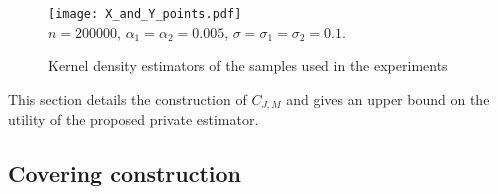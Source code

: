 \documentclass{article}
\theoremstyle{plain}
\theoremstyle{definition}
\theoremstyle{remark}
\begin{document}
\begin{figure*}[h!]
        \centering
        \texttt{[image: X\_and\_Y\_points.pdf]}  
    \\
    \centering
    $n = 200000$, $\alpha_1=\alpha_2 = 0.005$, $\sigma= \sigma_1=\sigma_2 = 0.1$.
    \caption{Kernel density estimators of the samples used in the experiments}
    \label{fig:samples}
    \end{figure*}



This section details the construction of $C_{J, M}$ and gives an upper bound on the utility of the proposed private estimator.

\subsection{Covering construction}
\end{document}
